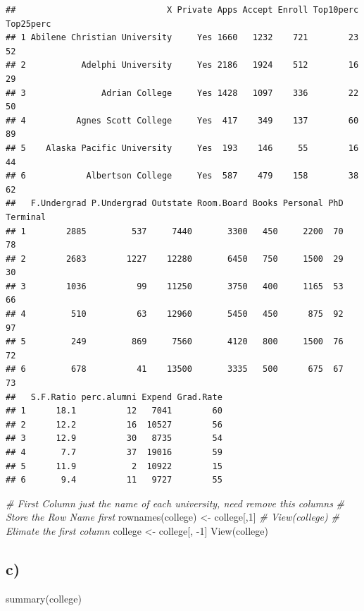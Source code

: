 \documentclass[
]{article}
\newenvironment{Shaded}{\begin{snugshade}}{\end{snugshade}}
\newcommand{\CommentTok}[1]{\textcolor[rgb]{0.56,0.35,0.01}{\textit{#1}}}
\newcommand{\DecValTok}[1]{\textcolor[rgb]{0.00,0.00,0.81}{#1}}
\newcommand{\FunctionTok}[1]{\textcolor[rgb]{0.00,0.00,0.00}{#1}}
\newcommand{\NormalTok}[1]{#1}
\newcommand{\OtherTok}[1]{\textcolor[rgb]{0.56,0.35,0.01}{#1}}
\newcommand{\SpecialCharTok}[1]{\textcolor[rgb]{0.00,0.00,0.00}{#1}}
\begin{document}
\begin{verbatim}
##                              X Private Apps Accept Enroll Top10perc Top25perc
## 1 Abilene Christian University     Yes 1660   1232    721        23        52
## 2           Adelphi University     Yes 2186   1924    512        16        29
## 3               Adrian College     Yes 1428   1097    336        22        50
## 4          Agnes Scott College     Yes  417    349    137        60        89
## 5    Alaska Pacific University     Yes  193    146     55        16        44
## 6            Albertson College     Yes  587    479    158        38        62
##   F.Undergrad P.Undergrad Outstate Room.Board Books Personal PhD Terminal
## 1        2885         537     7440       3300   450     2200  70       78
## 2        2683        1227    12280       6450   750     1500  29       30
## 3        1036          99    11250       3750   400     1165  53       66
## 4         510          63    12960       5450   450      875  92       97
## 5         249         869     7560       4120   800     1500  76       72
## 6         678          41    13500       3335   500      675  67       73
##   S.F.Ratio perc.alumni Expend Grad.Rate
## 1      18.1          12   7041        60
## 2      12.2          16  10527        56
## 3      12.9          30   8735        54
## 4       7.7          37  19016        59
## 5      11.9           2  10922        15
## 6       9.4          11   9727        55
\end{verbatim}

\begin{Shaded}
\begin{Highlighting}[]
\CommentTok{\# First Column just the name of each university, need remove this columns}
\CommentTok{\# Store the Row Name first}
\FunctionTok{rownames}\NormalTok{(college) }\OtherTok{\textless{}{-}}\NormalTok{ college[,}\DecValTok{1}\NormalTok{]}
\CommentTok{\# View(college)}
\CommentTok{\# Elimate the first column}
\NormalTok{college }\OtherTok{\textless{}{-}}\NormalTok{ college[, }\SpecialCharTok{{-}}\DecValTok{1}\NormalTok{]}
\FunctionTok{View}\NormalTok{(college)}
\end{Highlighting}
\end{Shaded}

\hypertarget{c-4}{%
\subsection{c)}\label{c-4}}

\begin{Shaded}
\begin{Highlighting}[]
\FunctionTok{summary}\NormalTok{(college)}
\end{Highlighting}
\end{Shaded}
\end{document}
